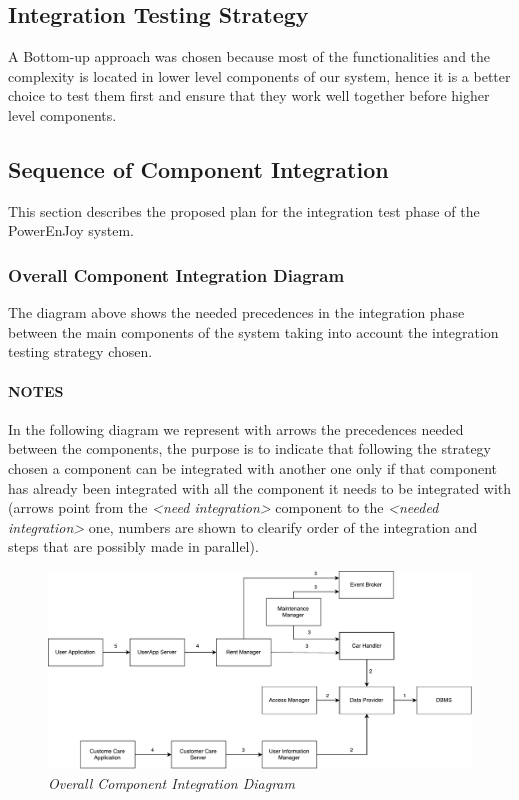 \subsection{Integration Testing Strategy} \label{sec:intStrategy}
A Bottom-up approach was chosen because most of the functionalities and the complexity is located in lower level components of our system, hence it is a better choice to test them first and ensure that they work well together before higher level components.

\clearpage
\subsection{Sequence of Component Integration}
This section describes the proposed plan for the integration test phase of the PowerEnJoy system.

\subsubsection{Overall Component Integration Diagram}  \label{sec:overallPrecedences}
The diagram above shows the needed precedences in the integration phase between the main components of the system taking into account the integration testing strategy chosen.

\paragraph{NOTES} In the following diagram we represent with arrows the precedences needed between the components, the purpose is to indicate that following the strategy chosen a component can be integrated with another one only if that component has already been integrated with all the component it needs to be integrated with (arrows point from the \emph{<need integration>} component to the \emph{<needed integration>} one, numbers are shown to clearify order of the integration and steps that are possibly made in parallel).

	\begin{figure}[h]
			\centering
			\includegraphics[width=\linewidth]{img/overallIntegration}
			\caption{
				\label{fig:overallIntegration} 
				\emph{Overall Component Integration Diagram}
			}
	\end{figure}
	
